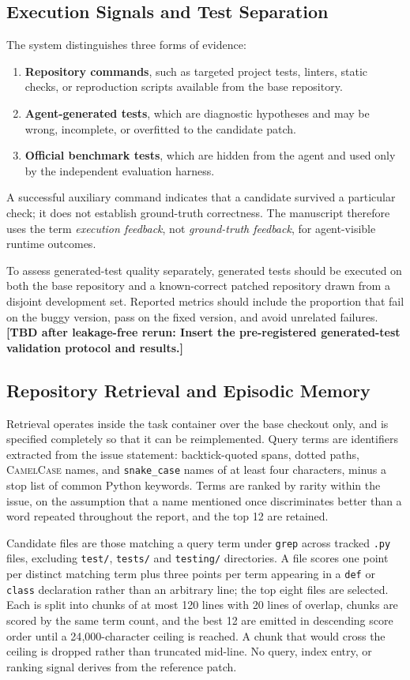 \documentclass[journal]{IEEEtran}
\newcommand{\tbd}[1]{\textcolor{red!70!black}{\textbf{[TBD after leakage-free rerun: #1]}}}
\begin{document}
\subsection{Execution Signals and Test Separation}

The system distinguishes three forms of evidence:
\begin{enumerate}
    \item \textbf{Repository commands}, such as targeted project tests, linters, static checks, or reproduction scripts available from the base repository.
    \item \textbf{Agent-generated tests}, which are diagnostic hypotheses and may be wrong, incomplete, or overfitted to the candidate patch.
    \item \textbf{Official benchmark tests}, which are hidden from the agent and used only by the independent evaluation harness.
\end{enumerate}
A successful auxiliary command indicates that a candidate survived a particular check; it does not establish ground-truth correctness. The manuscript therefore uses the term \emph{execution feedback}, not \emph{ground-truth feedback}, for agent-visible runtime outcomes.

To assess generated-test quality separately, generated tests should be executed on both the base repository and a known-correct patched repository drawn from a disjoint development set. Reported metrics should include the proportion that fail on the buggy version, pass on the fixed version, and avoid unrelated failures. \tbd{Insert the pre-registered generated-test validation protocol and results.}

\subsection{Repository Retrieval and Episodic Memory}

Retrieval operates inside the task container over the base checkout only, and is specified completely so that it can be reimplemented. Query terms are identifiers extracted from the issue statement: backtick-quoted spans, dotted paths, \textsc{CamelCase} names, and \texttt{snake\_case} names of at least four characters, minus a stop list of common Python keywords. Terms are ranked by rarity within the issue, on the assumption that a name mentioned once discriminates better than a word repeated throughout the report, and the top 12 are retained.

Candidate files are those matching a query term under \texttt{grep} across tracked \texttt{.py} files, excluding \texttt{test/}, \texttt{tests/} and \texttt{testing/} directories. A file scores one point per distinct matching term plus three points per term appearing in a \texttt{def} or \texttt{class} declaration rather than an arbitrary line; the top eight files are selected. Each is split into chunks of at most 120 lines with 20 lines of overlap, chunks are scored by the same term count, and the best 12 are emitted in descending score order until a 24{,}000-character ceiling is reached. A chunk that would cross the ceiling is dropped rather than truncated mid-line. No query, index entry, or ranking signal derives from the reference patch.
\end{document}
